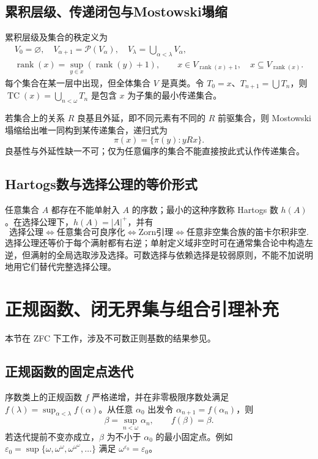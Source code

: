\documentclass[../main.tex]{subfiles}
\begin{document}
\subsection{累积层级、传递闭包与Mostowski塌缩}
累积层级及集合的秩定义为
\begin{gather*}
V_0=\varnothing,\quad V_{\alpha+1}=\mathcal P(V_\alpha),\quad
V_\lambda=\bigcup_{\alpha<\lambda}V_\alpha,\\
\operatorname{rank}(x)=\sup_{y\in x}(\operatorname{rank}(y)+1),\qquad
x\in V_{\operatorname{rank}(x)+1},\quad x\subseteq V_{\operatorname{rank}(x)}.
\end{gather*}
每个集合在某一层中出现，但全体集合 $V$ 是真类。令 $T_0=x$、$T_{n+1}=\bigcup T_n$，则 $\operatorname{TC}(x)=\bigcup_{n<\omega}T_n$ 是包含 $x$ 为子集的最小传递集合。

若集合上的关系 $R$ 良基且外延，即不同元素有不同的 $R$ 前驱集合，则 Mostowski 塌缩给出唯一同构到某传递集合，递归式为
\[
\pi(x)=\{\pi(y):yRx\}.
\]
良基性与外延性缺一不可；仅为任意偏序的集合不能直接按此式认作传递集合。

\subsection{Hartogs数与选择公理的等价形式}
任意集合 $A$ 都存在不能单射入 $A$ 的序数；最小的这种序数称 Hartogs 数 $h(A)$。在选择公理下，$h(A)=|A|^+$，并有
\[
\text{选择公理}\iff\text{任意集合可良序化}\iff\text{Zorn引理}
\iff\text{任意非空集合族的笛卡尔积非空}.
\]
选择公理还等价于每个满射都有右逆；单射定义域非空时可在通常集合论中构造左逆，但满射的全局选取涉及选择。可数选择与依赖选择是较弱原则，不能不加说明地用它们替代完整选择公理。
\section{正规函数、闭无界集与组合引理补充}
本节在 ZFC 下工作，涉及不可数正则基数的结果参见\cite{jech}。
\subsection{正规函数的固定点迭代}
序数类上的正规函数 $f$ 严格递增，并在非零极限序数处满足 $f(\lambda)=\sup_{\alpha<\lambda}f(\alpha)$。从任意 $\alpha_0$ 出发令 $\alpha_{n+1}=f(\alpha_n)$，则
\[
\beta=\sup_{n<\omega}\alpha_n,\qquad f(\beta)=\beta.
\]
若迭代提前不变亦成立，$\beta$ 为不小于 $\alpha_0$ 的最小固定点。例如 $\varepsilon_0=\sup\{\omega,\omega^\omega,\omega^{\omega^\omega},\ldots\}$ 满足 $\omega^{\varepsilon_0}=\varepsilon_0$。
\end{document}
